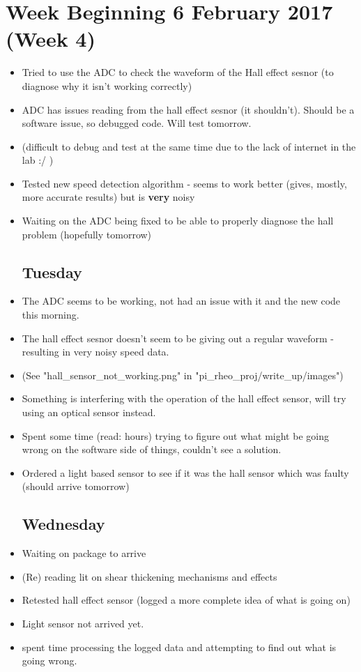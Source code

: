 \documentclass[a4]{report}
\begin{document}
	\section{Week Beginning 6 February 2017 (Week 4)}
	\begin{itemize}
		\subsection*{Monday}
		\item Tried to use the ADC to check the waveform of the Hall effect sesnor (to diagnose why it isn't working correctly)
		\item ADC has issues reading from the hall effect sesnor (it shouldn't). Should be a software issue, so debugged code. Will test tomorrow.
		\item (difficult to debug and test at the same time due to the lack of internet in the lab :/ )
		\item Tested new speed detection algorithm - seems to work better (gives, mostly, more accurate results) but is \textbf{very} noisy
		\item Waiting on the ADC being fixed to be able to properly diagnose the hall problem (hopefully tomorrow)
		\subsection*{Tuesday}
		\item The ADC seems to be working, not had an issue with it and the new code this morning.
		\item The hall effect sesnor doesn't seem to be giving out a regular waveform - resulting in very noisy speed data.
		\item (See "hall\_sensor\_not\_working.png" in "pi\_rheo\_proj/write\_up/images")
		\item Something is interfering with the operation of the hall effect sensor, will try using an optical sensor instead.
		\item Spent some time (read: hours) trying to figure out what might be going wrong on the software side of things, couldn't see a solution.
		\item Ordered a light based sensor to see if it was the hall sensor which was faulty (should arrive tomorrow)
		\subsection*{Wednesday}
		\item Waiting on package to arrive
		\item (Re) reading lit on shear thickening mechanisms and effects
		\item Retested hall effect sensor (logged a more complete idea of what is going on) 
		\item Light sensor not arrived yet.
		\item spent time processing the logged data and attempting to find out what is going wrong.

\end{itemize}
\end{document}
